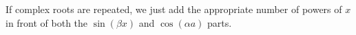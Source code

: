 \noindent
If complex roots are repeated, we just add the appropriate number of powers of $x$ in front of both the $\sin{(\beta x)}$ and $\cos{(\alpha a)}$ parts.
\pagebreak %

